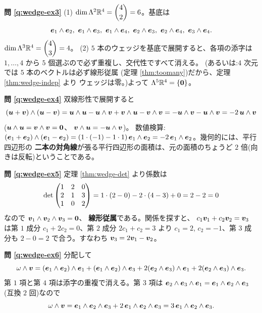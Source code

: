 \bigskip
\noindent\textbf{問 \ref{q:wedge-ex3}}\quad
(1) $\dim \Lambda^2 \mathbb{R}^4 = \dbinom{4}{2} = 6$。基底は
\[
\bm{e}_1 \wedge \bm{e}_2,\ \bm{e}_1 \wedge \bm{e}_3,\
\bm{e}_1 \wedge \bm{e}_4,\ \bm{e}_2 \wedge \bm{e}_3,\
\bm{e}_2 \wedge \bm{e}_4,\ \bm{e}_3 \wedge \bm{e}_4.
\]
$\dim \Lambda^3 \mathbb{R}^4 = \dbinom{4}{3} = 4$。
(2) $5$ 本のウェッジを基底で展開すると、各項の添字は
$1, \dots, 4$ から $5$ 個選ぶので必ず重複し、交代性ですべて消える。
(あるいは:$4$ 次元では $5$ 本のベクトルは必ず線形従属
(定理 \ref{thm:toomany})だから、定理 \ref{thm:wedge-indep} より
ウェッジは零。)よって $\Lambda^5 \mathbb{R}^4 = \{\bm{0}\}$。

\bigskip
\noindent\textbf{問 \ref{q:wedge-ex4}}\quad
双線形性で展開すると
\[
(\bm{u} + \bm{v}) \wedge (\bm{u} - \bm{v})
= \bm{u} \wedge \bm{u} - \bm{u} \wedge \bm{v}
+ \bm{v} \wedge \bm{u} - \bm{v} \wedge \bm{v}
= -\bm{u} \wedge \bm{v} - \bm{u} \wedge \bm{v}
= -2\,\bm{u} \wedge \bm{v}
\]
($\bm{u} \wedge \bm{u} = \bm{v} \wedge \bm{v} = \bm{0}$、
$\bm{v} \wedge \bm{u} = -\bm{u} \wedge \bm{v}$)。
数値検算:$(\bm{e}_1 + \bm{e}_2) \wedge (\bm{e}_1 - \bm{e}_2)
= (1 \cdot (-1) - 1 \cdot 1)\,\bm{e}_1 \wedge \bm{e}_2
= -2\,\bm{e}_1 \wedge \bm{e}_2$。幾何的には、平行四辺形の
\textbf{二本の対角線}が張る平行四辺形の面積は、元の面積のちょうど
$2$ 倍(向きは反転)ということである。

\bigskip
\noindent\textbf{問 \ref{q:wedge-ex5}}\quad
定理 \ref{thm:wedge-det} より係数は
\[
\det\begin{pmatrix}1 & 2 & 0 \\ 2 & 1 & 3 \\ 1 & 0 & 2\end{pmatrix}
= 1 \cdot (2 - 0) - 2 \cdot (4 - 3) + 0 = 2 - 2 = 0
\]
なので $\bm{v}_1 \wedge \bm{v}_2 \wedge \bm{v}_3 = \bm{0}$、
\textbf{線形従属}である。関係を探すと、
$c_1\bm{v}_1 + c_2\bm{v}_2 = \bm{v}_3$ は第 $1$ 成分
$c_1 + 2c_2 = 0$、第 $2$ 成分 $2c_1 + c_2 = 3$ より
$c_1 = 2$, $c_2 = -1$、第 $3$ 成分も $2 - 0 = 2$ で合う。すなわち
$\bm{v}_3 = 2\bm{v}_1 - \bm{v}_2$。

\bigskip
\noindent\textbf{問 \ref{q:wedge-ex6}}\quad
分配して
\[
\omega \wedge \bm{v}
= (\bm{e}_1 \wedge \bm{e}_2) \wedge \bm{e}_1
+ (\bm{e}_1 \wedge \bm{e}_2) \wedge \bm{e}_3
+ 2(\bm{e}_2 \wedge \bm{e}_3) \wedge \bm{e}_1
+ 2(\bm{e}_2 \wedge \bm{e}_3) \wedge \bm{e}_3.
\]
第 $1$ 項と第 $4$ 項は添字の重複で消える。第 $3$ 項は
$\bm{e}_2 \wedge \bm{e}_3 \wedge \bm{e}_1
= \bm{e}_1 \wedge \bm{e}_2 \wedge \bm{e}_3$(互換 $2$ 回)なので
\[
\omega \wedge \bm{v} = \bm{e}_1 \wedge \bm{e}_2 \wedge \bm{e}_3
+ 2\,\bm{e}_1 \wedge \bm{e}_2 \wedge \bm{e}_3
= 3\,\bm{e}_1 \wedge \bm{e}_2 \wedge \bm{e}_3.
\]

